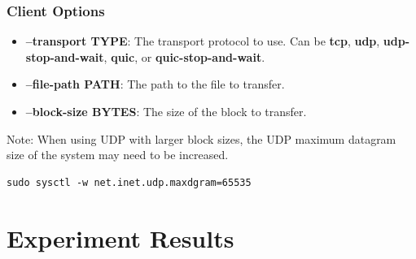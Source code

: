 \documentclass{article}
\begin{document}
\subsubsection{Client Options}
\begin{itemize}
    \item \textbf{--transport TYPE}: The transport protocol to use. Can be \textbf{tcp}, \textbf{udp}, \textbf{udp-stop-and-wait}, \textbf{quic}, or \textbf{quic-stop-and-wait}.
    \item \textbf{--file-path PATH}: The path to the file to transfer.
    \item \textbf{--block-size BYTES}: The size of the block to transfer.
\end{itemize}

Note: When using UDP with larger block sizes, the UDP maximum datagram size of the system may need to be increased.
\begin{verbatim}
sudo sysctl -w net.inet.udp.maxdgram=65535
\end{verbatim}

\section{Experiment Results}
\end{document}
